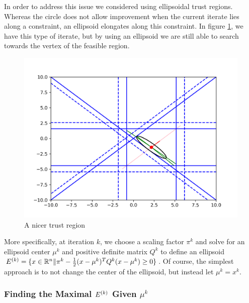 In order to address this issue we considered using ellipsoidal trust regions.
Whereas the circle does not allow improvement when the current iterate lies along a constraint, an ellipsoid elongates along this constraint.
In figure \cref{ellipse_adv}, we have this type of iterate, but by using an ellipsoid we are still able to search towards the vertex of the feasible region.
\begin{figure}[h]
    \centering
    \includegraphics[scale=0.4]{images/advantage_of_ellipse_2.png}
    \caption{A nicer trust region}
    \label{ellipse_adv}
\end{figure}


More specifically, at iteration $k$, we choose a scaling factor $\pi^k$ and solve for an ellipsoid center $\mu^k$ and positive definite matrix $Q^k$ to define an ellipsoid
$ {E^{(k)}} = \{x \in \mathbb R^n \| \pi^k - \frac 1 2 (x - \mu^{k})^TQ^{k}(x - \mu^{k}) \ge 0 \}$.
Of course, the simplest approach is to not change the center of the ellipsoid, but instead let $\mu^k = x^k$.


\subsubsection{Finding the Maximal $ {E^{(k)}} $ Given $\mu^k$}

\label{ellipse_optimization}

